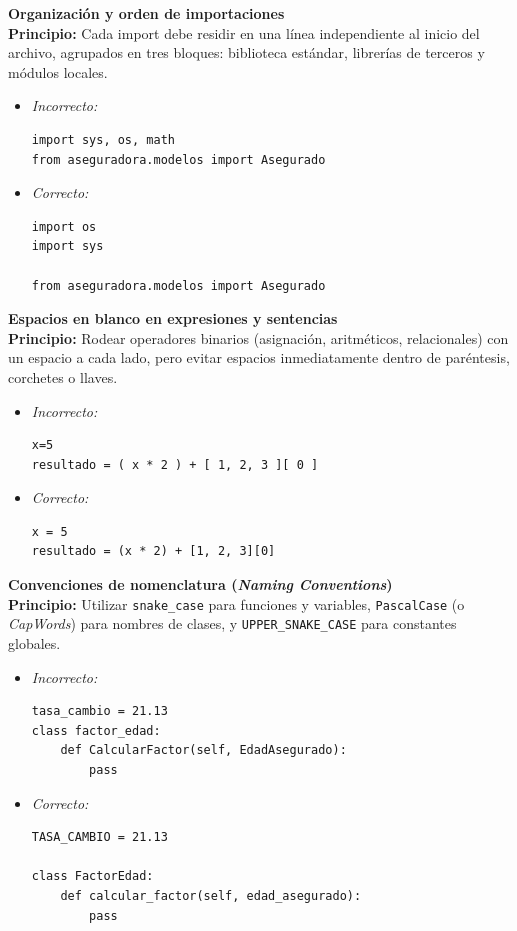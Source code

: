 \documentclass{article}
\begin{document}
    \item \textbf{Organización y orden de importaciones} \\
    \textbf{Principio:} Cada import debe residir en una línea independiente al inicio del archivo, agrupados en tres bloques: biblioteca estándar, librerías de terceros y módulos locales.
    \begin{itemize}
        \item \textit{Incorrecto:}
\begin{verbatim}
import sys, os, math
from aseguradora.modelos import Asegurado
\end{verbatim}
        \item \textit{Correcto:}
\begin{verbatim}
import os
import sys

from aseguradora.modelos import Asegurado
\end{verbatim}
    \end{itemize}

    \item \textbf{Espacios en blanco en expresiones y sentencias} \\
    \textbf{Principio:} Rodear operadores binarios (asignación, aritméticos, relacionales) con un espacio a cada lado, pero evitar espacios inmediatamente dentro de paréntesis, corchetes o llaves.
    \begin{itemize}
        \item \textit{Incorrecto:}
\begin{verbatim}
x=5
resultado = ( x * 2 ) + [ 1, 2, 3 ][ 0 ]
\end{verbatim}
        \item \textit{Correcto:}
\begin{verbatim}
x = 5
resultado = (x * 2) + [1, 2, 3][0]
\end{verbatim}
    \end{itemize}

    \item \textbf{Convenciones de nomenclatura (\textit{Naming Conventions})} \\
    \textbf{Principio:} Utilizar \texttt{snake\_case} para funciones y variables, \texttt{PascalCase} (o \textit{CapWords}) para nombres de clases, y \texttt{UPPER\_SNAKE\_CASE} para constantes globales.
    \begin{itemize}
        \item \textit{Incorrecto:}
\begin{verbatim}
tasa_cambio = 21.13
class factor_edad:
    def CalcularFactor(self, EdadAsegurado):
        pass
\end{verbatim}
        \item \textit{Correcto:}
\begin{verbatim}
TASA_CAMBIO = 21.13

class FactorEdad:
    def calcular_factor(self, edad_asegurado):
        pass
\end{verbatim}
    \end{itemize}
\end{document}
